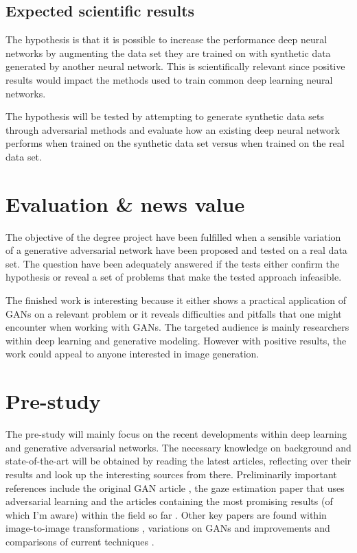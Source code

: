 \documentclass[a4paper]{article}
\begin{document}
\subsection{Expected scientific results}
The hypothesis is that it is possible to increase the performance deep neural networks by augmenting the data set they are trained on with synthetic data generated by another neural network. 
This is scientifically relevant since positive results would impact the methods used to train common deep learning neural networks. 

The hypothesis will be tested by attempting to generate synthetic data sets through adversarial methods and evaluate how an existing deep neural network performs when trained on the synthetic data set versus when trained on the real data set. 

\section{Evaluation  \& news value}
The objective of the degree project  have
been fulfilled when a 
sensible variation of a generative adversarial network have been proposed and
tested on a real data set. The question  have been adequately answered if the tests either confirm the
hypothesis or reveal a set of problems that make the tested approach infeasible.

The finished work is interesting because it either shows a practical application of GANs on a relevant problem or it reveals difficulties and pitfalls that one might encounter when working with GANs. The targeted audience is mainly researchers within deep learning and generative modeling. However with positive results, the work could appeal to anyone interested in image generation. 

\section{Pre-study}
The pre-study will mainly focus on the recent developments within deep learning
and  generative adversarial networks.
The necessary knowledge on background and state-of-the-art will be obtained by
reading the latest articles, reflecting over their results and
 look up the interesting sources from there.
Preliminarily \todo{,} important references include the original GAN article
\cite{goodfellow2014generative}, the gaze estimation paper that uses adversarial learning \cite{shrivastava2016learning} and the articles containing the most promising results (of which I'm aware) within the field so far \cite{karras2017progressive, miyato2017spectral}.
Other key papers are found within image-to-image transformations \cite{isola2016image,zhu2017unpaired}, variations on GANs \cite{arjovsky2017wasserstein,berthelot2017began,odena2016conditional} and improvements and comparisons of current techniques \cite{salimans2016improved,gulrajani2017improved,lucic2017gans,xiang2017effects}.
\end{document}
